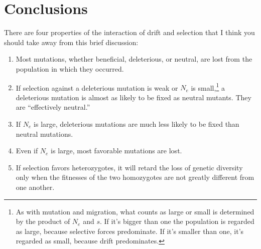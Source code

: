 \documentclass[12pt]{article}
\begin{document}
\section*{Conclusions}

There are four properties of the interaction of drift and selection
that I think you should take away from this brief
discussion:

\begin{enumerate}

\item Most mutations, whether beneficial, deleterious, or neutral, are
  lost from the population in which they occurred.

\item If selection against a deleterious mutation is weak or $N_e$ is
  small,\footnote{As with mutation and migration, what counts as large
    or small is determined by the product of $N_e$ and $s$. If it's
    bigger than one the population is regarded as large, because
    selective forces predominate. If it's smaller than one, it's
    regarded as small, because drift predominates.} a deleterious
  mutation is almost as likely to be fixed as neutral mutants. They
  are ``effectively neutral.''

\item If $N_e$ is large, deleterious mutations are much less likely to
  be fixed than neutral mutations.

\item Even if $N_e$ is large, most favorable mutations are lost.

\item If selection favors heterozygotes, it will retard the loss of
  genetic diversity only when the fitnesses of the two homozygotes are
  not greatly different from one another.

\end{enumerate}




\ccLicense
\end{document}
